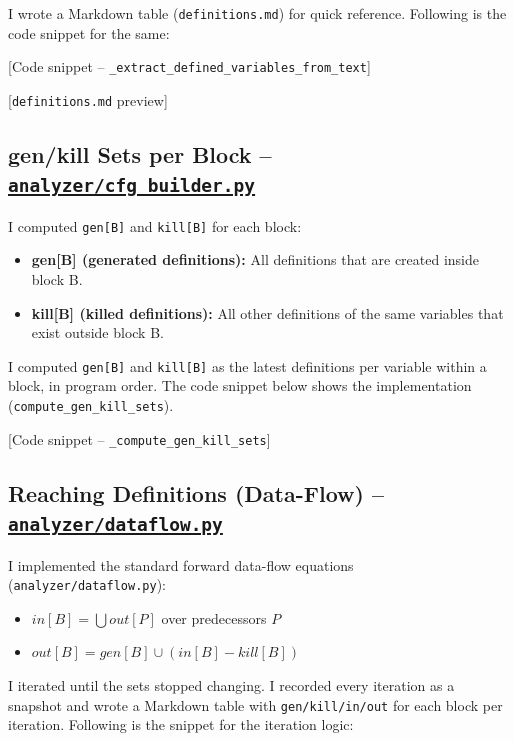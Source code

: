 \documentclass[10pt,a4paper]{report}
\begin{document}
I wrote a Markdown table (\texttt{definitions.md}) for quick reference. Following is the code snippet for the same:

[Code snippet -- \texttt{\_extract\_defined\_variables\_from\_text}]

[\texttt{definitions.md} preview]

\subsection{gen/kill Sets per Block -- \href{https://github.com/ShardulJunagade/cs202-stt/tree/main/lab7/analyzer/cfg_builder.py}{\texttt{analyzer/cfg\_builder.py}}}

I computed \texttt{gen[B]} and \texttt{kill[B]} for each block:
\begin{itemize}[itemsep=0em, topsep=0pt]
    \item \textbf{gen[B] (generated definitions):} All definitions that are created inside block B.
    \item \textbf{kill[B] (killed definitions):} All other definitions of the same variables that exist outside block B.
\end{itemize}
I computed \texttt{gen[B]} and \texttt{kill[B]} as the latest definitions per variable within a block, in program order. The code snippet below shows the implementation (\texttt{compute\_gen\_kill\_sets}).

[Code snippet -- \texttt{\_compute\_gen\_kill\_sets}]


\subsection{Reaching Definitions (Data-Flow) -- \href{https://github.com/ShardulJunagade/cs202-stt/tree/main/lab7/analyzer/dataflow.py}{\texttt{analyzer/dataflow.py}}}
I implemented the standard forward data-flow equations (\texttt{analyzer/dataflow.py}):
\begin{itemize}[itemsep=0em, topsep=0pt]
    \item $in[B] = \bigcup out[P]$ over predecessors $P$
    \item $out[B] = gen[B] \cup (in[B] - kill[B])$
\end{itemize}

I iterated until the sets stopped changing. I recorded every iteration as a snapshot and wrote a Markdown table with \texttt{gen/kill/in/out} for each block per iteration. Following is the snippet for the iteration logic:
\end{document}
